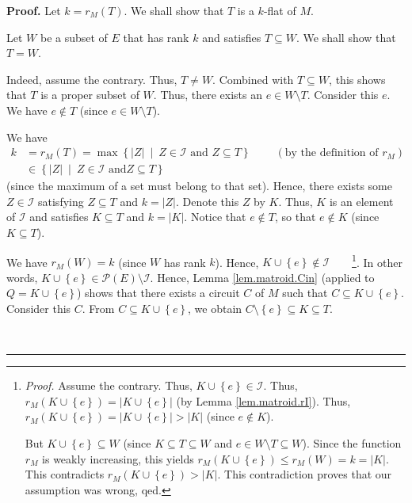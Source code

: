 \documentclass[numbers=enddot,12pt,final,onecolumn,notitlepage]{scrartcl}%
\theoremstyle{definition}
\newenvironment{proof}[1][Proof]{\noindent\textbf{#1.} }{\ \rule{0.5em}{0.5em}}
\begin{document}
\begin{proof}
Let $k=r_{M}\left(  T\right)  $. We shall show that $T$ is a $k$-flat of $M$.

Let $W$ be a subset of $E$ that has rank $k$ and satisfies $T\subseteq W$. We
shall show that $T=W$.

Indeed, assume the contrary. Thus, $T\neq W$. Combined with $T\subseteq W$,
this shows that $T$ is a proper subset of $W$. Thus, there exists an $e\in
W\setminus T$. Consider this $e$. We have $e\notin T$ (since $e\in W\setminus
T$).

We have
\begin{align*}
k  &  =r_{M}\left(  T\right)  =\max\left\{  \left\vert Z\right\vert
\ \mid\ Z\in\mathcal{I}\text{ and }Z\subseteq T\right\}
\ \ \ \ \ \ \ \ \ \ \left(  \text{by the definition of }r_{M}\right) \\
&  \in\left\{  \left\vert Z\right\vert \ \mid\ Z\in\mathcal{I}\text{ and
}Z\subseteq T\right\}
\end{align*}
(since the maximum of a set must belong to that set). Hence, there exists some
$Z\in\mathcal{I}$ satisfying $Z\subseteq T$ and $k=\left\vert Z\right\vert $.
Denote this $Z$ by $K$. Thus, $K$ is an element of $\mathcal{I}$ and satisfies
$K\subseteq T$ and $k=\left\vert K\right\vert $. Notice that $e\notin T$, so
that $e\notin K$ (since $K\subseteq T$).

We have $r_{M}\left(  W\right)  =k$ (since $W$ has rank $k$). Hence,
$K\cup\left\{  e\right\}  \notin\mathcal{I}$\ \ \ \ \footnote{\textit{Proof.}
Assume the contrary. Thus, $K\cup\left\{  e\right\}  \in\mathcal{I}$. Thus,
$r_{M}\left(  K\cup\left\{  e\right\}  \right)  =\left\vert K\cup\left\{
e\right\}  \right\vert $ (by Lemma \ref{lem.matroid.rI}). Thus, $r_{M}\left(
K\cup\left\{  e\right\}  \right)  =\left\vert K\cup\left\{  e\right\}
\right\vert >\left\vert K\right\vert $ (since $e\notin K$).
\par
But $K\cup\left\{  e\right\}  \subseteq W$ (since $K\subseteq T\subseteq W$
and $e\in W\setminus T\subseteq W$). Since the function $r_{M}$ is weakly
increasing, this yields $r_{M}\left(  K\cup\left\{  e\right\}  \right)  \leq
r_{M}\left(  W\right)  =k=\left\vert K\right\vert $. This contradicts
$r_{M}\left(  K\cup\left\{  e\right\}  \right)  >\left\vert K\right\vert $.
This contradiction proves that our assumption was wrong, qed.}. In other
words, $K\cup\left\{  e\right\}  \in\mathcal{P}\left(  E\right)
\setminus\mathcal{I}$. Hence, Lemma \ref{lem.matroid.Cin} (applied to
$Q=K\cup\left\{  e\right\}  $) shows that there exists a circuit $C$ of $M$
such that $C\subseteq K\cup\left\{  e\right\}  $. Consider this $C$. From
$C\subseteq K\cup\left\{  e\right\}  $, we obtain $C\setminus\left\{
e\right\}  \subseteq K\subseteq T$.


\end{proof}
\end{document}
